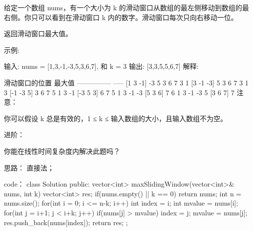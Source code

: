 给定一个数组 nums，有一个大小为 k 的滑动窗口从数组的最左侧移动到数组的最右侧。你只可以看到在滑动窗口 k 内的数字。滑动窗口每次只向右移动一位。

返回滑动窗口最大值。

示例:

输入: nums = [1,3,-1,-3,5,3,6,7], 和 k = 3
输出: [3,3,5,5,6,7] 
解释: 

  滑动窗口的位置                最大值
---------------               -----
[1  3  -1] -3  5  3  6  7       3
 1 [3  -1  -3] 5  3  6  7       3
 1  3 [-1  -3  5] 3  6  7       5
 1  3  -1 [-3  5  3] 6  7       5
 1  3  -1  -3 [5  3  6] 7       6
 1  3  -1  -3  5 [3  6  7]      7
注意：

你可以假设 k 总是有效的，1 ≤ k ≤ 输入数组的大小，且输入数组不为空。

进阶：

你能在线性时间复杂度内解决此题吗？























思路：
直接法；
























code：
class Solution {
public:
    vector<int> maxSlidingWindow(vector<int>& nums, int k) {
        vector<int> res;
        if(nums.empty() || k == 0) return nums;
        int n = nums.size();
        for(int i = 0; i <= n-k; i++)
        {
            int index = i;
            int mvalue = nums[i];
            for(int j = i+1; j < i+k; j++)
            {
                if(nums[j] > mvalue)
                {
                    index = j; mvalue = nums[j];
                }
            }
            res.push_back(nums[index]);
        }
        return res;
    }
};